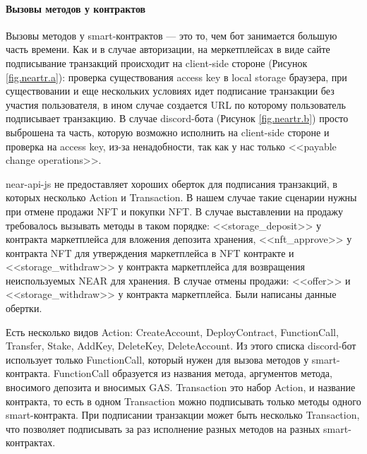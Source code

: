 \paragraph{Вызовы методов у контрактов}

Вызовы методов у smart-контрактов --- это то, чем бот занимается большую часть времени. Как и в случае авторизации, на меркетплейсах в виде сайте подписывание транзакций происходит на client-side стороне (Рисунок {\color{blue} \ref{fig.neartr.a}}): проверка существования access key в local storage браузера, при существовании и еще нескольких условиях идет подписание транзакции без участия пользователя, в ином случае создается URL по которому пользователь подписывает транзакцию. В случае discord-бота (Рисунок {\color{blue} \ref{fig.neartr.b}}) просто выброшена та часть, которую возможно исполнить на client-side стороне и проверка на access key, из-за ненадобности, так как у нас только <<payable change operations>>.

near-api-js не предоставляет хороших оберток для подписания транзакций, в которых несколько Action и Transaction. В нашем случае такие сценарии нужны при отмене продажи NFT и покупки NFT. В случае выставлении на продажу требовалось вызывать методы в таком порядке: <<storage\_deposit>> у контракта маркетплейса для вложения депозита хранения, <<nft\_approve>> у контракта NFT для утверждения маркетплейса в NFT контракте и <<storage\_withdraw>> у контракта маркетплейса для возвращения неиспользуемых NEAR для хранения. В случае отмены продажи: <<offer>> и <<storage\_withdraw>> у контракта маркетплейса. Были написаны данные обертки.

\begin{definition}
    Есть несколько видов Action: CreateAccount, DeployContract, FunctionCall, Transfer, Stake, AddKey, DeleteKey, DeleteAccount. Из этого списка discord-бот использует только FunctionCall, который нужен для вызова методов у smart-контракта. FunctionCall образуется из названия метода, аргументов метода, вносимого депозита и вносимых GAS. Transaction это набор Action, и название контракта, то есть в одном Transaction можно подписывать только методы одного smart-контракта. При подписании транзакции может быть несколько Transaction, что позволяет подписывать за раз исполнение разных методов на разных smart-контрактах.
\end{definition}

